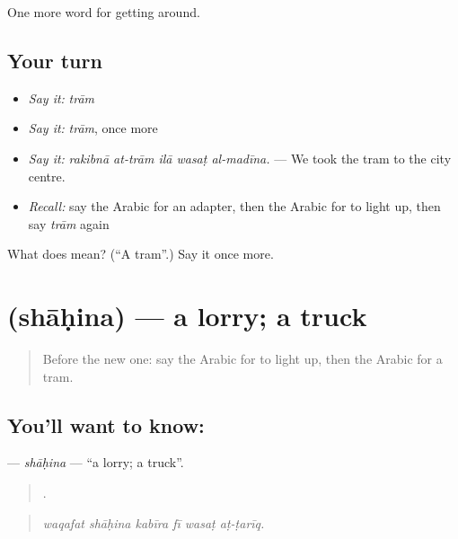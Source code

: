 \begin{grammarlens}[title={What you've built}]
One more word for getting around.
\end{grammarlens}

\subsection*{Your turn}
\begin{itemize}
\raggedright
  \item \emph{Say it:} \emph{trām}
  \item \emph{Say it:} \emph{trām}, once more
  \item \emph{Say it:} \emph{rakibnā at-trām ilā wasaṭ al-madīna.} — We took the tram to the city centre.
  \item \emph{Recall:} say the Arabic for an adapter, then the Arabic for to light up, then say \emph{trām} again
\end{itemize}

\begin{tcolorbox}[breakable,colback=teal!4,colframe=teal!35!black,title={Before you move on}]
What does  mean? (\textquotedblleft{}A tram\textquotedblright{}.) Say it once more.
\end{tcolorbox}
\section[\texorpdfstring{\ar{شاحنة} (shāḥina)}{شاحنة (shāḥina)}]{ (shāḥina) — a lorry; a truck}

\label{lesson:AR-C445-shahina}



\begin{quote}
Before the new one: say the Arabic for to light up, then the Arabic for a tram.
\end{quote}

\subsection*{You'll want to know: }
\textbf{} — \emph{shāḥina} — \textquotedblleft{}a lorry; a truck\textquotedblright{}.

\begin{quote}
     .
\end{quote}

\begin{quote}
\emph{waqafat shāḥina kabīra fī wasaṭ aṭ-ṭarīq.}
\end{quote}

